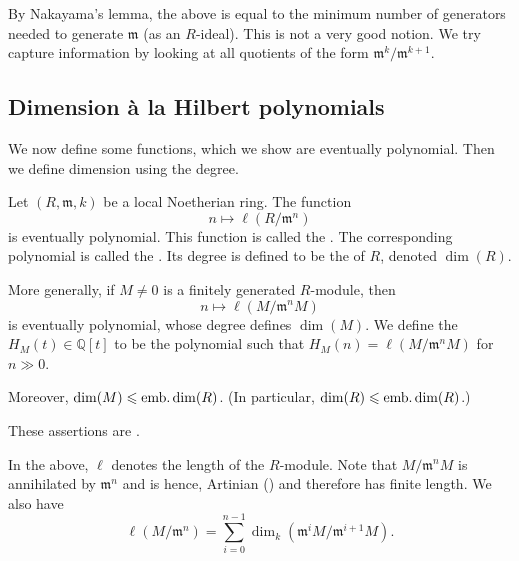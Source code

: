 \documentclass[12pt]{article}
\begin{document}
By Nakayama's lemma, the above is equal to the minimum number of generators needed to generate $\mathfrak{m}$ (as an $R$-ideal). This is not a very good notion. We try capture information by looking at all quotients of the form $\mathfrak{m}^{k}/\mathfrak{m}^{k + 1}$.

\subsection{Dimension \`{a} la Hilbert polynomials}

We now define some functions, which we show are eventually polynomial. Then we define dimension using the degree.

\begin{defn} \label{defn:hilbert-samuel-function}
	Let $(R, \mathfrak{m}, k)$ be a local Noetherian ring. The function
	\begin{equation*} 
		n \mapsto \ell(R/\mathfrak{m}^{n})
	\end{equation*}
	is eventually polynomial. This function is called the . \newline
	The corresponding polynomial is called the . Its degree is defined to be the  of $R$, denoted $\dim(R)$.

	More generally, if $M \neq 0$ is a finitely generated $R$-module, then
	\begin{equation*} 
		n \mapsto \ell(M/\mathfrak{m}^{n} M)
	\end{equation*}
	is eventually polynomial, whose degree defines $\dim(M)$. We define the  $H_{M}(t) \in \mathbb{Q}[t]$ to be the polynomial such that $H_{M}(n) = \ell(M/\mathfrak{m}^{n} M)$ for $n \gg 0$.

	Moreover, $\dim(M) \leqslant \operatorname{emb.dim}(R)$. (In particular, $\dim(R) \leqslant \operatorname{emb.dim}(R)$.)
\end{defn}
These assertions are .

In the above, $\ell$ denotes the length of the $R$-module. Note that $M/\mathfrak{m}^{n} M$ is annihilated by $\mathfrak{m}^{n}$ and is hence, Artinian () and therefore has finite length. We also have
\begin{equation*} 
	\ell(M/\mathfrak{m}^{n}) = \sum_{i = 0}^{n - 1} \dim_{k}(\mathfrak{m}^{i}M/\mathfrak{m}^{i + 1}M).
\end{equation*}
\end{document}
